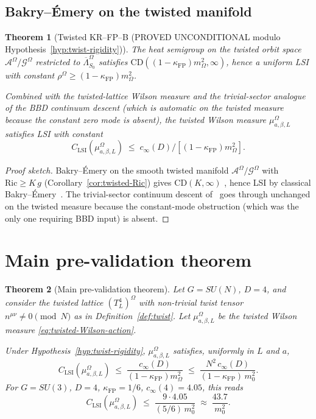 \documentclass[11pt,a4paper]{amsart}
\newtheorem{theorem}{Theorem}[section]
\theoremstyle{definition}
\newcommand{\Ric}{\mathrm{Ric}}
\newcommand{\kFP}{\kappa_{\mathrm{FP}}}
\newcommand{\cinf}{c_{\infty}}
\begin{document}
\subsection{Bakry--\'Emery on the twisted manifold}

\begin{theorem}[Twisted KR--FP--B (PROVED UNCONDITIONAL modulo
Hypothesis~\ref{hyp:twist-rigidity})]\label{thm:KRFPB-twisted}
The heat semigroup on the twisted orbit space $\mathcal A^\Omega/
\mathcal G^\Omega$ restricted to $\overline\Lambda^\Omega_{S_0}$
satisfies $\mathrm{CD}((1-\kFP) m_\Omega^2, \infty)$, hence a uniform
LSI with constant $\rho^\Omega \geq (1-\kFP) m_\Omega^2$.

Combined with the twisted-lattice Wilson measure and the trivial-sector
analogue of the BBD continuum descent (which is automatic on the
twisted measure because the constant zero mode is absent), the twisted
Wilson measure $\mu^\Omega_{a,\beta,L}$ satisfies LSI with constant
$$
C_\mathrm{LSI}(\mu^\Omega_{a,\beta,L}) \;\leq\; \cinf(D) / [(1-\kFP) m_\Omega^2].
$$
\end{theorem}
\begin{proof}[Proof sketch]
Bakry--\'Emery on the smooth twisted manifold
$\mathcal A^\Omega/\mathcal G^\Omega$ with $\Ric \geq K\,g$
(Corollary~\ref{cor:twisted-Ric}) gives $\mathrm{CD}(K,\infty)$
\cite[Thm.~4.1]{RemondiereKRFPB_2026}, hence LSI by classical
Bakry--\'Emery~\cite{BakryEmery1985, BakryGentilLedoux2014}. The
trivial-sector continuum descent of~\cite[\S 5]{RemondiereKRFPB_2026}
goes through unchanged on the twisted measure because the constant-mode
obstruction (which was the only one requiring BBD input) is absent.
\end{proof}

\section{Main pre-validation theorem}\label{sec:main}

\begin{theorem}[Main pre-validation theorem]\label{thm:main}
Let $G = SU(N)$, $D = 4$, and consider the twisted lattice
$(T^4_L)^\Omega$ with non-trivial twist tensor $n^{\mu\nu} \neq 0
\pmod N$ as in Definition~\ref{def:twist}. Let
$\mu^\Omega_{a,\beta,L}$ be the twisted Wilson measure
\eqref{eq:twisted-Wilson-action}.

Under Hypothesis~\ref{hyp:twist-rigidity}, $\mu^\Omega_{a,\beta,L}$
satisfies, uniformly in $L$ and $a$,
$$
C_\mathrm{LSI}(\mu^\Omega_{a,\beta,L}) \;\leq\; \frac{\cinf(D)}{(1-\kFP) m_\Omega^2}
\;\leq\; \frac{N^2\,\cinf(D)}{(1-\kFP)\,m_0^2}.
$$
For $G = SU(3)$, $D = 4$, $\kFP = 1/6$, $\cinf(4) = 4.05$, this reads
$$
C_\mathrm{LSI}(\mu^\Omega_{a,\beta,L}) \;\leq\; \frac{9 \cdot 4.05}{(5/6)\,m_0^2}
\;\approx\; \frac{43.7}{m_0^2}.
$$
\end{theorem}
\end{document}

